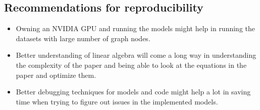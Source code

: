 \subsection{Recommendations for reproducibility}\label{subsec:recommendations}
\begin{itemize}
    \item Owning an NVIDIA GPU and running the models might help in running the datasets with large number of graph
    nodes.
    \item Better understanding of linear algebra will come a long way in understanding the complexity of the paper and
    being able to look at the equations in the paper and optimize them.
    \item Better debugging techniques for models and code might help a lot in saving time when trying to figure out
    issues in the implemented models.
\end{itemize}